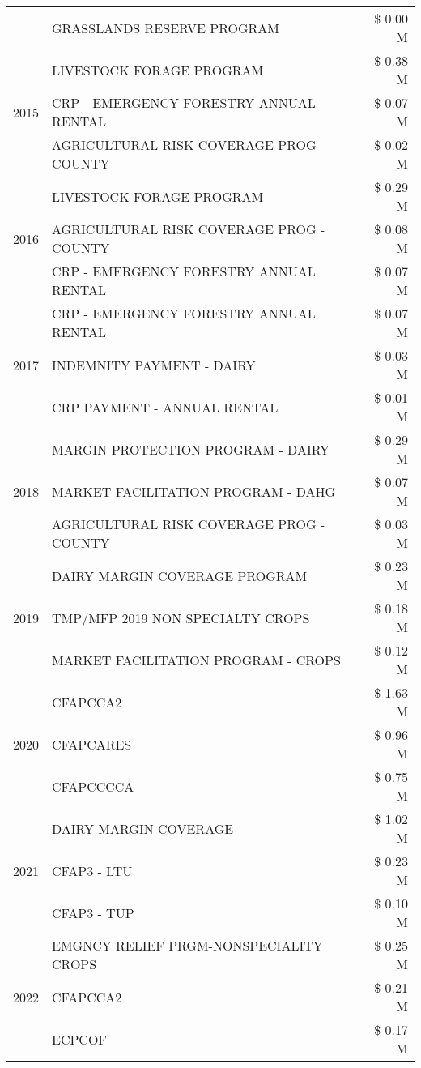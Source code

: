 \begin{tabular}{llr}
 & GRASSLANDS RESERVE PROGRAM & \$ 0.00 M \\
\cline{1-3}
\multirow[t]{3}{*}{2015} & LIVESTOCK FORAGE PROGRAM & \$ 0.38 M \\
 & CRP - EMERGENCY FORESTRY ANNUAL RENTAL & \$ 0.07 M \\
 & AGRICULTURAL RISK COVERAGE PROG - COUNTY & \$ 0.02 M \\
\cline{1-3}
\multirow[t]{3}{*}{2016} & LIVESTOCK FORAGE PROGRAM & \$ 0.29 M \\
 & AGRICULTURAL RISK COVERAGE PROG - COUNTY & \$ 0.08 M \\
 & CRP - EMERGENCY FORESTRY ANNUAL RENTAL & \$ 0.07 M \\
\cline{1-3}
\multirow[t]{3}{*}{2017} & CRP - EMERGENCY FORESTRY ANNUAL RENTAL & \$ 0.07 M \\
 & INDEMNITY PAYMENT - DAIRY & \$ 0.03 M \\
 & CRP PAYMENT - ANNUAL RENTAL & \$ 0.01 M \\
\cline{1-3}
\multirow[t]{3}{*}{2018} & MARGIN PROTECTION PROGRAM - DAIRY & \$ 0.29 M \\
 & MARKET FACILITATION PROGRAM - DAHG & \$ 0.07 M \\
 & AGRICULTURAL RISK COVERAGE PROG - COUNTY & \$ 0.03 M \\
\cline{1-3}
\multirow[t]{3}{*}{2019} & DAIRY MARGIN COVERAGE PROGRAM & \$ 0.23 M \\
 & TMP/MFP 2019 NON SPECIALTY CROPS & \$ 0.18 M \\
 & MARKET FACILITATION PROGRAM - CROPS & \$ 0.12 M \\
\cline{1-3}
\multirow[t]{3}{*}{2020} & CFAPCCA2 & \$ 1.63 M \\
 & CFAPCARES & \$ 0.96 M \\
 & CFAPCCCCA & \$ 0.75 M \\
\cline{1-3}
\multirow[t]{3}{*}{2021} & DAIRY MARGIN COVERAGE & \$ 1.02 M \\
 & CFAP3 - LTU & \$ 0.23 M \\
 & CFAP3 - TUP & \$ 0.10 M \\
\cline{1-3}
\multirow[t]{3}{*}{2022} & EMGNCY RELIEF PRGM-NONSPECIALITY CROPS & \$ 0.25 M \\
 & CFAPCCA2 & \$ 0.21 M \\
 & ECPCOF & \$ 0.17 M \\
\cline{1-3}
\bottomrule
\end{tabular}
